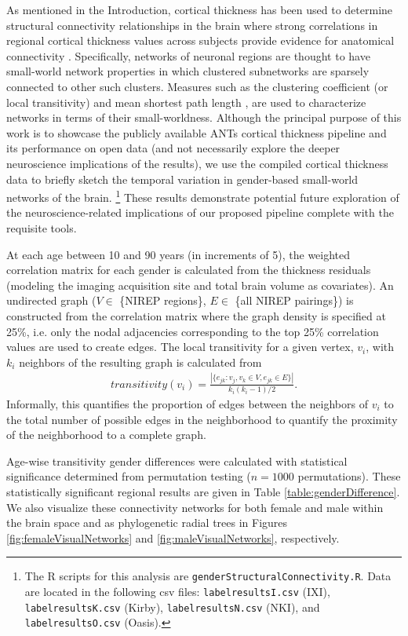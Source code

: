 As mentioned in the Introduction, cortical thickness has
been used to determine structural connectivity relationships in the brain 
where strong correlations in regional cortical 
thickness values across subjects provide evidence for anatomical
connectivity \citep{he2007,chen2008,he2008}.  Specifically, networks of neuronal
regions are thought to have small-world network properties \citep{sporns2004} 
in which clustered subnetworks are sparsely connected to other such clusters.
Measures such as the
clustering coefficient (or local transitivity) and mean shortest path length
\citep{watts1998}, are used to characterize networks in terms of their 
small-worldness.
Although the principal purpose of this work is to showcase the 
publicly available ANTs cortical thickness pipeline and its performance
on open data
(and not necessarily explore the deeper neuroscience implications of 
the results), we use the compiled cortical thickness data to briefly sketch
the temporal variation in gender-based small-world networks of the
brain.%
\footnote{
The R scripts for this analysis are {\tt genderStructuralConnectivity.R}.  Data are located in the following csv files: 
{\tt labelresultsI.csv} (IXI), 
{\tt labelresultsK.csv} (Kirby),
{\tt labelresultsN.csv} (NKI), and
{\tt labelresultsO.csv} (Oasis).
}
These results demonstrate potential future exploration of the
neuroscience-related implications of our proposed pipeline complete
with the requisite tools.

At each age between 10 and 90 years (in increments of 5), the weighted correlation
matrix for each gender is calculated from the thickness residuals 
(modeling the imaging acquisition site and total brain volume as covariates).  An undirected graph ($V \in$ \{NIREP regions\}, $E \in$ \{all NIREP pairings\})
is constructed from the correlation matrix where the graph density is specified at 25\%, i.e. only the nodal adjacencies corresponding to the top 25\% correlation values are used to create edges.    The local transitivity for a given vertex, $v_i$, with $k_i$ neighbors of the resulting graph is calculated from
\begin{align}
  transitivity(v_i) = \frac{|\{e_{jk}: v_j, v_k \in V, e_{jk} \in E \}|}{k_i (k_i-1)/2}.
\end{align}
Informally, this quantifies the proportion of edges between the neighbors of $v_i$ to the total number of possible edges in the neighborhood to quantify the proximity of the neighborhood to a complete graph.  

Age-wise transitivity gender differences were calculated with statistical
significance determined from permutation testing ($n = 1000$ permutations).  These statistically significant regional results are given in Table \ref{table:genderDifference}.  
We also visualize these connectivity networks for both female and male within the brain
space and as phylogenetic radial trees in Figures \ref{fig:femaleVisualNetworks} and \ref{fig:maleVisualNetworks}, respectively.

